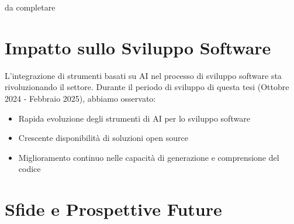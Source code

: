 \documentclass[12pt,a4paper,openright,twoside]{book}
\begin{document}
da completare

\section{Impatto sullo Sviluppo Software}
L'integrazione di strumenti basati su AI nel processo di sviluppo software sta rivoluzionando il settore. Durante il periodo di sviluppo di questa tesi (Ottobre 2024 - Febbraio 2025), abbiamo osservato:
\begin{itemize}
    \item Rapida evoluzione degli strumenti di AI per lo sviluppo software
    \item Crescente disponibilità di soluzioni open source
    \item Miglioramento continuo nelle capacità di generazione e comprensione del codice
\end{itemize}

\section{Sfide e Prospettive Future}


%



\backmatter

\nocite{*} %


%

\end{document}
